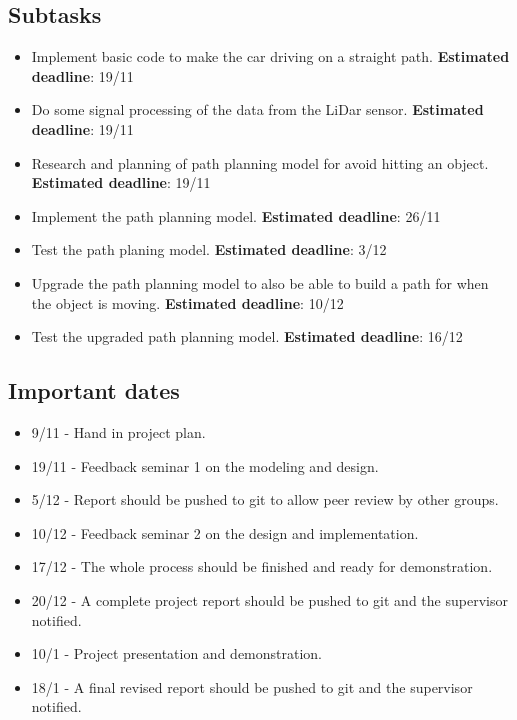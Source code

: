 \documentclass{article}
\begin{document}
\subsection{Subtasks}
    \begin{itemize}
        \item Implement basic code to make the car driving on a straight path. \textbf{Estimated deadline}: 19/11
        \item Do some signal processing of the data from the LiDar sensor.  \textbf{Estimated deadline}: 19/11
        \item Research and planning of path planning model for avoid hitting an object. \textbf{Estimated deadline}: 19/11
        \item Implement the path planning model. \textbf{Estimated deadline}: 26/11    
        \item Test the path planing model. \textbf{Estimated deadline}: 3/12
        \item Upgrade the path planning model to also be able to build a path for when the object is moving.  \textbf{Estimated deadline}: 10/12
        \item Test the upgraded path planning model. \textbf{Estimated deadline}: 16/12
        
    \end{itemize}
    
\subsection{Important dates}
    \begin{itemize}
        \item 9/11 -  Hand in project plan.
        \item 19/11 - Feedback seminar 1 on the modeling and design.
        \item 5/12 - Report should be pushed to git to allow peer review by other groups.
        \item 10/12 - Feedback seminar 2 on the design and implementation.
        \item 17/12 - The whole process should be finished and ready for demonstration.
        \item 20/12 - A complete project report should be pushed to git and the supervisor notified.
        \item 10/1 - Project presentation and demonstration.
        \item 18/1 - A final revised report should be pushed to git and the supervisor notified.
    \end{itemize}
\end{document}
